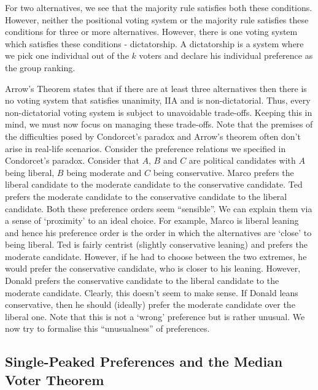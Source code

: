 \documentclass{article}
\theoremstyle{definition}
\begin{document}
For two alternatives, we see that the majority rule satisfies both these conditions. However, neither the positional voting system or the majority rule satisfies these conditions for three or more alternatives. However, there is one voting system which satisfies these conditions - dictatorship. A dictatorship is a system where we pick one individual out of the $k$ voters and declare his individual preference as the group ranking. \medskip

Arrow's Theorem states that if there are at least three alternatives then there is no voting system that satisfies unanimity, IIA and is non-dictatorial. Thus, every non-dictatorial voting system is subject to unavoidable trade-offs. Keeping this in mind, we must now focus on managing these trade-offs. Note that the premises of the difficulties posed by Condorcet's paradox and Arrow's theorem often don't arise in real-life scenarios. Consider the preference relations we specified in Condorcet's paradox. Consider that $A$, $B$ and $C$ are political candidates with $A$ being liberal, $B$ being moderate and $C$ being conservative. Marco prefers the liberal candidate to the moderate candidate to the conservative candidate. Ted prefers the moderate candidate to the conservative candidate to the liberal candidate. Both these preference orders seem ``sensible''. We can explain them via a sense of `proximity' to an ideal choice. For example, Marco is liberal leaning and hence his preference order is the order in which the alternatives are `close' to being liberal. Ted is fairly centrist (slightly conservative leaning) and prefers the moderate candidate. However, if he had to choose between the two extremes, he would prefer the conservative candidate, who is closer to his leaning. However, Donald prefers the conservative candidate to the liberal candidate to the moderate candidate. Clearly, this doesn't seem to make sense. If Donald leans conservative, then he should (ideally) prefer the moderate candidate over the liberal one. Note that this is not a `wrong' preference but is rather unusual. We now try to formalise this ``unusualness'' of preferences.

\subsection{Single-Peaked Preferences and the Median Voter Theorem}
\end{document}
